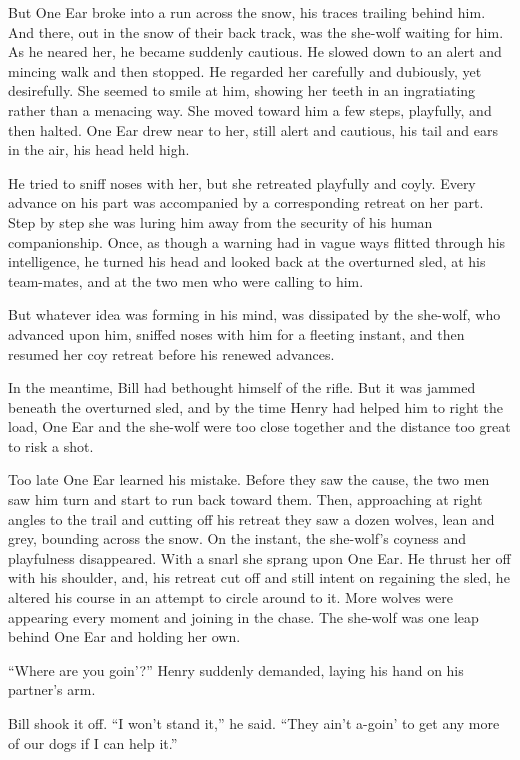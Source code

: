 \documentclass[10pt]{book}
\begin{document}
But One Ear broke into a run across the snow, his traces trailing
behind him. And there, out in the snow of their back track, was the
she-wolf waiting for him. As he neared her, he became suddenly
cautious. He slowed down to an alert and mincing walk and then stopped.
He regarded her carefully and dubiously, yet desirefully. She seemed to
smile at him, showing her teeth in an ingratiating rather than a
menacing way. She moved toward him a few steps, playfully, and then
halted. One Ear drew near to her, still alert and cautious, his tail
and ears in the air, his head held high.

He tried to sniff noses with her, but she retreated playfully and
coyly. Every advance on his part was accompanied by a corresponding
retreat on her part. Step by step she was luring him away from the
security of his human companionship. Once, as though a warning had in
vague ways flitted through his intelligence, he turned his head and
looked back at the overturned sled, at his team-mates, and at the two
men who were calling to him.

But whatever idea was forming in his mind, was dissipated by the
she-wolf, who advanced upon him, sniffed noses with him for a fleeting
instant, and then resumed her coy retreat before his renewed advances.

In the meantime, Bill had bethought himself of the rifle. But it was
jammed beneath the overturned sled, and by the time Henry had helped
him to right the load, One Ear and the she-wolf were too close together
and the distance too great to risk a shot.

Too late One Ear learned his mistake. Before they saw the cause, the
two men saw him turn and start to run back toward them. Then,
approaching at right angles to the trail and cutting off his retreat
they saw a dozen wolves, lean and grey, bounding across the snow. On
the instant, the she-wolf’s coyness and playfulness disappeared. With a
snarl she sprang upon One Ear. He thrust her off with his shoulder,
and, his retreat cut off and still intent on regaining the sled, he
altered his course in an attempt to circle around to it. More wolves
were appearing every moment and joining in the chase. The she-wolf was
one leap behind One Ear and holding her own.

“Where are you goin’?” Henry suddenly demanded, laying his hand on his
partner’s arm.

Bill shook it off. “I won’t stand it,” he said. “They ain’t a-goin’ to
get any more of our dogs if I can help it.”
\end{document}
